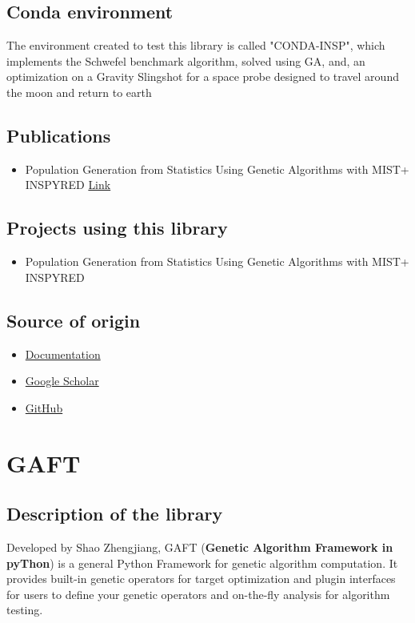 \documentclass{article}
\begin{document}
	\subsection{Conda environment}
	The environment created to test this library is called "CONDA-INSP", which implements the Schwefel benchmark algorithm, solved using GA, and, an optimization on a Gravity Slingshot for a space probe designed to travel around the moon and return to earth
	\subsection{Publications}
	\begin{itemize}
		\item   Population Generation from Statistics Using Genetic Algorithms with MIST+ INSPYRED \href{https://sites.google.com/site/jacobbarhak/home/MODSIM2014_MIST_INSPYRED_Paper_Submit_2014_03_10.pdf}{Link}
	\end{itemize}
	\subsection{Projects using this library}
	\begin{itemize}
		\item    Population Generation from Statistics Using Genetic Algorithms with MIST+ INSPYRED
	\end{itemize}
	\subsection{Source of origin}
	\begin{itemize}
		\item \href{https://pythonhosted.org/inspyred/index.html}{Documentation}
		\item \href{https://scholar.google.com/scholar?hl=it&as_sdt=02C5&q=pyeasyga&btnG=}{Google Scholar}
		\item \href{https://github.com/aarongarrett/inspyred}{GitHub}
	\end{itemize}
	
	\section{GAFT}
	\subsection{Description of the library}
	Developed by Shao Zhengjiang, GAFT (\textbf{Genetic Algorithm Framework in pyThon}) is a general Python Framework for genetic algorithm computation. It provides built-in genetic operators for target optimization and plugin interfaces for users to define your genetic operators and on-the-fly analysis for algorithm testing.
\end{document}
